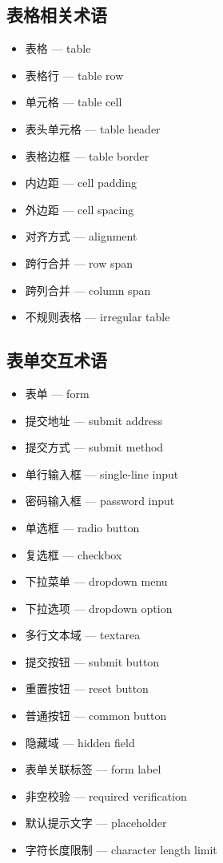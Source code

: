 \subsection{表格相关术语}
\begin{itemize}
\item 表格 — table
\item 表格行 — table row
\item 单元格 — table cell
\item 表头单元格 — table header
\item 表格边框 — table border
\item 内边距 — cell padding
\item 外边距 — cell spacing
\item 对齐方式 — alignment
\item 跨行合并 — row span
\item 跨列合并 — column span
\item 不规则表格 — irregular table
\end{itemize}

\subsection{表单交互术语}
\begin{itemize}
\item 表单 — form
\item 提交地址 — submit address
\item 提交方式 — submit method
\item 单行输入框 — single-line input
\item 密码输入框 — password input
\item 单选框 — radio button
\item 复选框 — checkbox
\item 下拉菜单 — dropdown menu
\item 下拉选项 — dropdown option
\item 多行文本域 — textarea
\item 提交按钮 — submit button
\item 重置按钮 — reset button
\item 普通按钮 — common button
\item 隐藏域 — hidden field
\item 表单关联标签 — form label
\item 非空校验 — required verification
\item 默认提示文字 — placeholder
\item 字符长度限制 — character length limit
\end{itemize}

